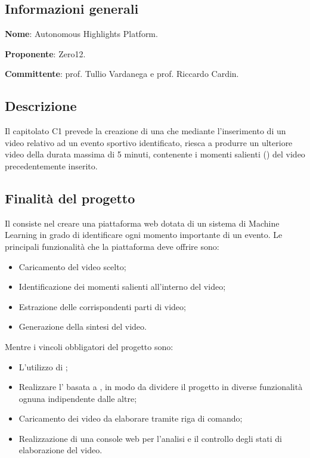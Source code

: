 \documentclass[../studio-di-fattibilita.tex]{subfiles}
\begin{document}
\subsection{Informazioni generali}%
\label{sub:informazioni_generale}
\begin{description}
  \item \textbf{Nome}: Autonomous Highlights Platform.
  \item \textbf{Proponente}: Zero12.
  \item \textbf{Committente}: prof. Tullio Vardanega e prof. Riccardo Cardin.
\end{description}

\subsection{Descrizione}%
\label{sub:descrizione}
Il capitolato C1 prevede la creazione di una  che mediante l'inserimento di un video relativo ad un evento sportivo identificato, riesca a produrre un ulteriore video della durata massima di 5 minuti, contenente i momenti salienti () del video precedentemente inserito.

\subsection{Finalità del progetto}%
\label{sub:finalita_del_progetto}
Il  consiste nel creare una piattaforma web dotata di un sistema di Machine Learning in grado di identificare ogni momento importante di un evento.
Le principali funzionalità che la piattaforma deve offrire sono:
\begin{itemize}
  \item Caricamento del video scelto;
  \item Identificazione dei momenti salienti all'interno del video;
  \item Estrazione delle corrispondenti parti di video;
  \item Generazione della sintesi del video.
\end{itemize}
Mentre i vincoli obbligatori del progetto sono:
\begin{itemize}
  \item L'utilizzo di ;
  \item Realizzare l' basata a , in modo da dividere il progetto in diverse funzionalità ognuna indipendente dalle altre;
  \item Caricamento dei video da elaborare tramite riga di comando;
  \item Realizzazione di una console web per l'analisi e il controllo degli stati di elaborazione del video.
\end{itemize}
\end{document}
